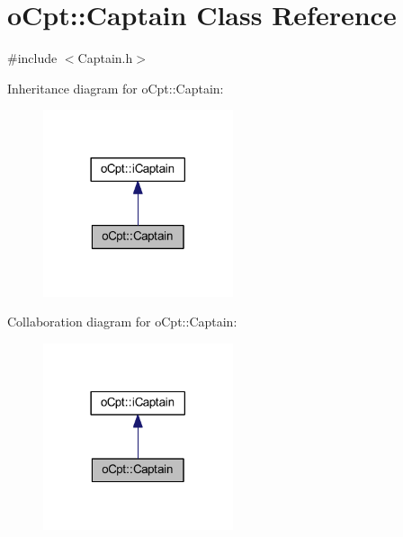 \hypertarget{classo_cpt_1_1_captain}{}\section{o\+Cpt\+:\+:Captain Class Reference}
\label{classo_cpt_1_1_captain}


{\ttfamily \#include $<$Captain.\+h$>$}



Inheritance diagram for o\+Cpt\+:\+:Captain\+:
\nopagebreak
\begin{figure}[H]
\begin{center}
\leavevmode
\includegraphics[width=158pt]{classo_cpt_1_1_captain__inherit__graph}
\end{center}
\end{figure}


Collaboration diagram for o\+Cpt\+:\+:Captain\+:
\nopagebreak
\begin{figure}[H]
\begin{center}
\leavevmode
\includegraphics[width=158pt]{classo_cpt_1_1_captain__coll__graph}
\end{center}
\end{figure}
